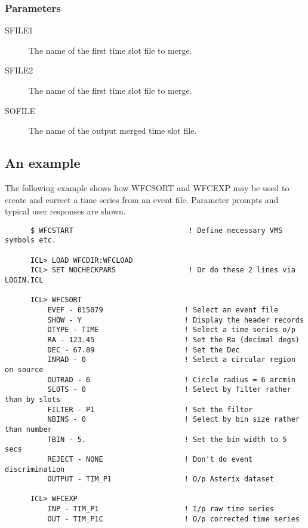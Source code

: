 \subsubsection{Parameters}
\begin{description}
\item[SFILE1]
The name of the first time slot file to merge.
\item[SFILE2]
The name of the first time slot file to merge.
\item[SOFILE]
The name of the output merged time slot file.
\end{description}

\subsection{An example}
 The following example shows how WFCSORT and WFCEXP may be used to
create and correct a time series from an event file. Parameter prompts and 
typical user responses are shown.

\begin{small}
\begin{verbatim}
      $ WFCSTART                           ! Define necessary VMS symbols etc.

      ICL> LOAD WFCDIR:WFCLOAD
      ICL> SET NOCHECKPARS                 ! Or do these 2 lines via LOGIN.ICL

      ICL> WFCSORT
          EVEF - 015079                   ! Select an event file
          SHOW - Y                        ! Display the header records
          DTYPE - TIME                    ! Select a time series o/p
          RA - 123.45                     ! Set the Ra (decimal degs)
          DEC - 67.89                     ! Set the Dec
          INRAD - 0                       ! Select a circular region on source
          OUTRAD - 6                      ! Circle radius = 6 arcmin
          SLOTS - 0                       ! Select by filter rather than by slots
          FILTER - P1                     ! Set the filter
          NBINS - 0                       ! Select by bin size rather than number
          TBIN - 5.                       ! Set the bin width to 5 secs
          REJECT - NONE                   ! Don't do event discrimination
          OUTPUT - TIM_P1                 ! O/p Asterix dataset
 
      ICL> WFCEXP
          INP - TIM_P1                    ! I/p raw time series
          OUT - TIM_P1C                   ! O/p corrected time series
\end{verbatim}
\end{small}


